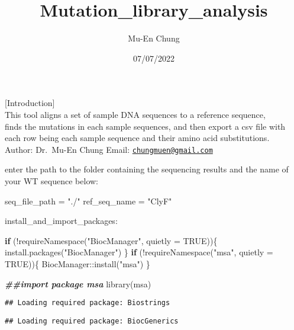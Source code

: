 \documentclass[
]{article}
\title{Mutation\_library\_analysis}
\author{Mu-En Chung}
\date{07/07/2022}
\newenvironment{Shaded}{\begin{snugshade}}{\end{snugshade}}
\newcommand{\AttributeTok}[1]{\textcolor[rgb]{0.77,0.63,0.00}{#1}}
\newcommand{\ConstantTok}[1]{\textcolor[rgb]{0.00,0.00,0.00}{#1}}
\newcommand{\ControlFlowTok}[1]{\textcolor[rgb]{0.13,0.29,0.53}{\textbf{#1}}}
\newcommand{\DocumentationTok}[1]{\textcolor[rgb]{0.56,0.35,0.01}{\textbf{\textit{#1}}}}
\newcommand{\FunctionTok}[1]{\textcolor[rgb]{0.00,0.00,0.00}{#1}}
\newcommand{\NormalTok}[1]{#1}
\newcommand{\OtherTok}[1]{\textcolor[rgb]{0.56,0.35,0.01}{#1}}
\newcommand{\SpecialCharTok}[1]{\textcolor[rgb]{0.00,0.00,0.00}{#1}}
\newcommand{\StringTok}[1]{\textcolor[rgb]{0.31,0.60,0.02}{#1}}
\begin{document}
\maketitle

{[}Introduction{]}\\
This tool aligns a set of sample DNA sequences to a reference
sequence,\\
finds the mutations in each sample sequences, and then export a csv file
with each row being each sample sequence and their amino acid
substitutions.\\
Author: Dr.~Mu-En Chung Email:
\href{mailto:chungmuen@gmail.com}{\nolinkurl{chungmuen@gmail.com}}

enter the path to the folder containing the sequencing results and the
name of your WT sequence below:

\begin{Shaded}
\begin{Highlighting}[]
\NormalTok{seq\_file\_path }\OtherTok{=} \StringTok{"./"}                                                            
\NormalTok{ref\_seq\_name }\OtherTok{=} \StringTok{"ClyF"}
\end{Highlighting}
\end{Shaded}

install\_and\_import\_packages:

\begin{Shaded}
\begin{Highlighting}[]
\ControlFlowTok{if}\NormalTok{ (}\SpecialCharTok{!}\FunctionTok{requireNamespace}\NormalTok{(}\StringTok{"BiocManager"}\NormalTok{, }\AttributeTok{quietly =} \ConstantTok{TRUE}\NormalTok{))\{}
   \FunctionTok{install.packages}\NormalTok{(}\StringTok{"BiocManager"}\NormalTok{)}
\NormalTok{\}}
\ControlFlowTok{if}\NormalTok{ (}\SpecialCharTok{!}\FunctionTok{requireNamespace}\NormalTok{(}\StringTok{"msa"}\NormalTok{, }\AttributeTok{quietly =} \ConstantTok{TRUE}\NormalTok{))\{}
\NormalTok{   BiocManager}\SpecialCharTok{::}\FunctionTok{install}\NormalTok{(}\StringTok{"msa"}\NormalTok{)}
\NormalTok{\}}

\DocumentationTok{\#\#import package msa}
\FunctionTok{library}\NormalTok{(msa)}
\end{Highlighting}
\end{Shaded}

\begin{verbatim}
## Loading required package: Biostrings
\end{verbatim}

\begin{verbatim}
## Loading required package: BiocGenerics
\end{verbatim}
\end{document}
